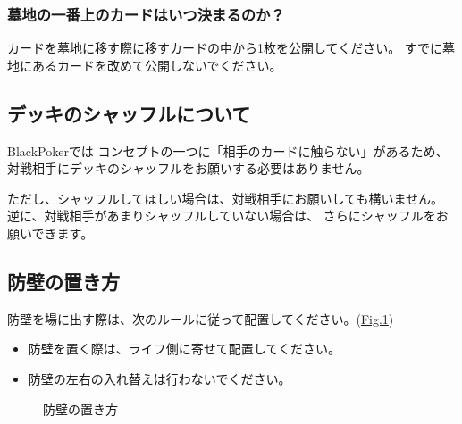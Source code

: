 \documentclass[letterpaper,10pt,dvipdfmx]{sphinxmanual}
\begin{document}
\subsubsection{墓地の一番上のカードはいつ決まるのか？}
\label{\detokenize{common/common:id38}}
\sphinxAtStartPar
カードを墓地に移す際に移すカードの中から1枚を公開してください。
すでに墓地にあるカードを改めて公開しないでください。


\subsection{デッキのシャッフルについて}
\label{\detokenize{common/common:id39}}
\sphinxAtStartPar
BlackPokerでは
コンセプトの一つに「相手のカードに触らない」があるため、
対戦相手にデッキのシャッフルをお願いする必要はありません。

\sphinxAtStartPar
ただし、シャッフルしてほしい場合は、対戦相手にお願いしても構いません。
逆に、対戦相手があまりシャッフルしていない場合は、
さらにシャッフルをお願いできます。


\subsection{防壁の置き方}
\label{\detokenize{common/common:id40}}
\sphinxAtStartPar
防壁を場に出す際は、次のルールに従って配置してください。(\hyperref[\detokenize{common/common:set-bulwork}]{Fig.\@ \ref{\detokenize{common/common:set-bulwork}}})
\begin{itemize}
\item {} 
\sphinxAtStartPar
防壁を置く際は、ライフ側に寄せて配置してください。

\item {} 
\sphinxAtStartPar
防壁の左右の入れ替えは行わないでください。

\end{itemize}

\begin{figure}[htbp]
\centering
\capstart

\noindent{}
\caption{防壁の置き方}\label{\detokenize{common/common:id52}}\label{\detokenize{common/common:set-bulwork}}\end{figure}
\end{document}
